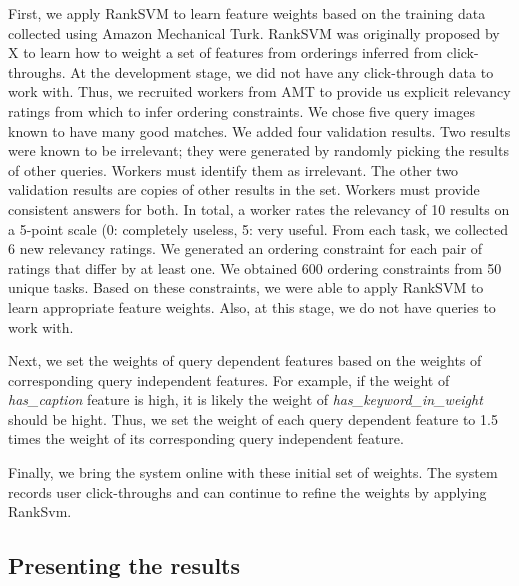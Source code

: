 \documentclass{www2010-submission}
\begin{document}
First, we apply RankSVM to learn feature weights based on the training
data collected using Amazon Mechanical Turk. RankSVM was originally
proposed by X to learn how to weight a set of features from orderings
inferred from click-throughs. At the development stage, we did not
have any click-through data to work with. Thus, we recruited workers
from AMT to provide us explicit relevancy ratings from which to infer
ordering constraints. We chose five query images known to have many
good matches. We added four validation results.  Two results were
known to be irrelevant; they were generated by randomly picking the
results of other queries. Workers must identify them as
irrelevant. The other two validation results are copies of other
results in the set. Workers must provide consistent answers for
both. In total, a worker rates the relevancy of 10 results on a
5-point scale (0: completely useless, 5: very useful. From each task,
we collected 6 new relevancy ratings. We generated an ordering
constraint for each pair of ratings that differ by at least one. We
obtained 600 ordering constraints from 50 unique tasks. Based on these
constraints, we were able to apply RankSVM to learn appropriate feature
weights. Also, at this stage, we do not have queries to work with.

Next, we set the weights of query dependent features based on the
weights of corresponding query independent features. For example, if
the weight of \emph{has\_caption} feature is high, it is likely the
weight of \emph{has\_keyword\_in\_weight} should be hight. Thus, we set
the weight of each query dependent feature to 1.5 times the weight of
its corresponding query independent feature.

Finally, we bring the system online with these initial set of
weights. The system records user click-throughs and can continue to
refine the weights by applying RankSvm.

\subsection{Presenting the results}

\end{document}

